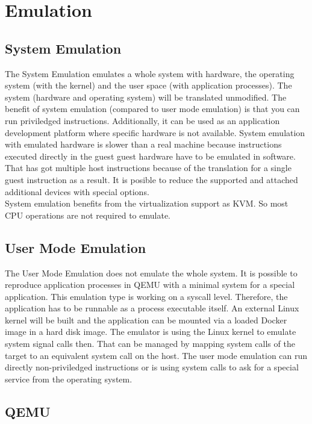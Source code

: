 
\chapter{Emulation}\label{ch:emulation}

\section{System Emulation}

The System Emulation emulates a whole system with hardware, the operating system (with the kernel) and the user space (with application processes). 
The system (hardware and operating system) will be translated unmodified. The benefit of system emulation (compared to user mode emulation) is that you can run priviledged instructions\cite{Butt2011}. 
Additionally, it can be used as an application development platform where specific hardware is not available. 
System emulation with emulated hardware is slower than a real machine because instructions executed directly in the guest guest hardware have to be emulated in software. 
That has got multiple host instructions because of the translation for a single guest instruction as a result\cite[~p.1]{Tong2014}.
It is posible to reduce the supported and attached additional devices with special options. \\
System emulation benefits from the virtualization support as KVM. So most CPU operations are not required to emulate.

\section{User Mode Emulation}

The User Mode Emulation does not emulate the whole system. It is possible to reproduce application processes in QEMU with a minimal system for a special application. 
This emulation type is working on a syscall level. Therefore, the application has to be runnable as a process executable itself. 
An external Linux kernel will be built and the application can be mounted via a loaded Docker image in a hard disk image. The emulator is using the Linux kernel to emulate system signal calls then. That can be managed by mapping system calls of the target to an equivalent system call on the host.
The user mode emulation can run directly non-priviledged instructions or is using system calls to ask for a special service from the operating system\cite{Butt2011}.


\section{QEMU}

